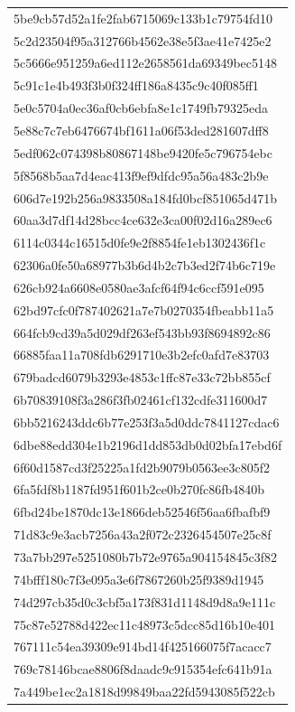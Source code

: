 \begin{tabular}{l}
5be9cb57d52a1fe2fab6715069c133b1c79754fd10 \\
5c2d23504f95a312766b4562e38e5f3ae41e7425e2 \\
5c5666e951259a6ed112e2658561da69349bec5148 \\
5c91c1e4b493f3b0f324ff186a8435c9c40f085ff1 \\
5e0c5704a0ec36af0cb6ebfa8e1c1749fb79325eda \\
5e88c7c7eb6476674bf1611a06f53ded281607dff8 \\
5edf062c074398b80867148be9420fe5c796754ebc \\
5f8568b5aa7d4eac413f9ef9dfdc95a56a483c2b9e \\
606d7e192b256a9833508a184fd0bcf851065d471b \\
60aa3d7df14d28bcc4ce632e3ca00f02d16a289ec6 \\
6114c0344c16515d0fe9e2f8854fe1eb1302436f1c \\
62306a0fe50a68977b3b6d4b2c7b3ed2f74b6c719e \\
626cb924a6608e0580ae3afcf64f94c6ccf591e095 \\
62bd97cfc0f787402621a7e7b0270354fbeabb11a5 \\
664fcb9cd39a5d029df263ef543bb93f8694892c86 \\
66885faa11a708fdb6291710e3b2efc0afd7e83703 \\
679badcd6079b3293e4853c1ffc87e33c72bb855cf \\
6b70839108f3a286f3fb02461cf132cdfe311600d7 \\
6bb5216243ddc6b77e253f3a5d0ddc7841127cdac6 \\
6dbe88edd304e1b2196d1dd853db0d02bfa17ebd6f \\
6f60d1587cd3f25225a1fd2b9079b0563ee3c805f2 \\
6fa5fdf8b1187fd951f601b2ce0b270fc86fb4840b \\
6fbd24be1870dc13e1866deb52546f56aa6fbafbf9 \\
71d83c9e3acb7256a43a2f072c2326454507e25c8f \\
73a7bb297e5251080b7b72e9765a904154845c3f82 \\
74bfff180c7f3e095a3e6f7867260b25f9389d1945 \\
74d297cb35d0c3cbf5a173f831d1148d9d8a9e111c \\
75c87e52788d422ec11c48973c5dcc85d16b10e401 \\
767111c54ea39309e914bd14f425166075f7acacc7 \\
769c78146bcae8806f8daadc9c915354efc641b91a \\
7a449be1ec2a1818d99849baa22fd5943085f522cb \\

\end{tabular}
